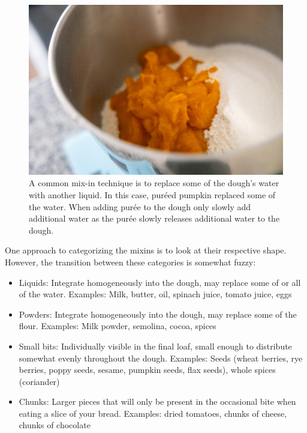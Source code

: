 \begin{figure}[htb!]
  \centering
  \includegraphics[width=\textwidth]{pumpkin-on-flour}
  \caption[Pumpkin purée]{A common mix-in technique is to replace some of
    the dough's water with another liquid. In this case, puréed pumpkin replaced
    some of the water. When adding purée to the dough only slowly add
    additional water as the purée slowly releases additional water to the
    dough.}%
\end{figure}

One approach to categorizing the mixins is to look at their respective shape.
However, the transition between these categories is somewhat fuzzy:

\begin{itemize}
  \item Liquids: Integrate homogeneously into the dough, may replace some of
      or all of the water. Examples: Milk, butter, oil, spinach juice, tomato
      juice, eggs
  \item Powders: Integrate homogeneously into the dough, may replace some of
      the flour. Examples: Milk powder, semolina, cocoa, spices
  \item Small bits: Individually visible in the final loaf, small enough to
      distribute somewhat evenly throughout the dough. Examples: Seeds (wheat
      berries, rye berries, poppy seeds, sesame, pumpkin seeds,
      flax seeds), whole spices (coriander)
  \item Chunks: Larger pieces that will only be present in the occasional bite
      when eating a slice of your bread. Examples: dried tomatoes, chunks of
      cheese, chunks of chocolate
\end{itemize}

